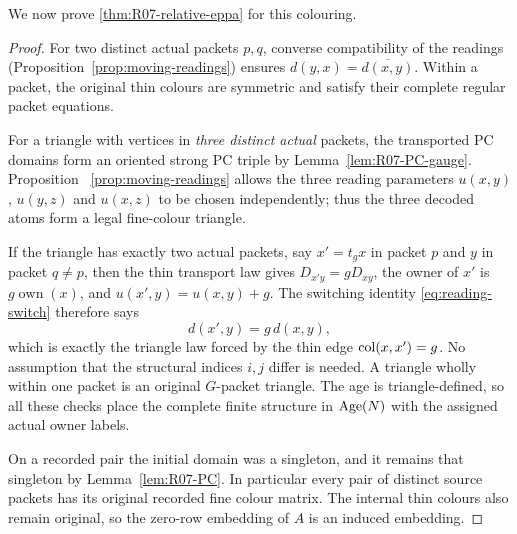 We now prove \cref{thm:R07-relative-eppa} for this colouring.

\begin{proof}
For two distinct actual packets $p,q$, converse
compatibility of the readings
(Proposition~\ref{prop:moving-readings}) ensures
$d(y,x)=\overline{d(x,y)}$.  Within a packet, the original
thin colours are symmetric and satisfy their complete
regular packet equations.

For a triangle with vertices in \emph{three distinct actual}
packets, the transported PC domains form an oriented strong
PC triple by Lemma~\ref{lem:R07-PC-gauge}.  Proposition~
\ref{prop:moving-readings} allows the three reading parameters
$u(x,y)$, $u(y,z)$ and $u(x,z)$ to be chosen independently;
thus the three decoded atoms form a legal fine-colour triangle.

If the triangle has exactly two actual packets, say
$x'=t_gx$ in packet $p$ and $y$ in packet $q\ne p$,
then the thin transport law gives
$D_{x'y}=gD_{xy}$, the owner of $x'$ is
$g\operatorname{own}(x)$, and
$u(x',y)=u(x,y)+g$.  The switching identity
\eqref{eq:reading-switch} therefore says
\[
 d(x',y)=g\,d(x,y),
\]
which is exactly the triangle law forced by the thin edge
$\operatorname{col}(x,x')=g$.  No assumption that the structural indices
$i,j$ differ is needed.  A triangle wholly within one packet
is an original $G$-packet triangle.  The age is triangle-defined,
so all these checks place the complete finite structure in
$\operatorname{Age}(N)$ with the assigned actual owner labels.

On a recorded pair the initial domain was a singleton, and it
remains that singleton by Lemma~\ref{lem:R07-PC}.
In particular every pair of distinct source packets has its
original recorded fine colour matrix.  The internal thin
colours also remain original, so the zero-row embedding of $A$
is an induced embedding.


\end{proof}
